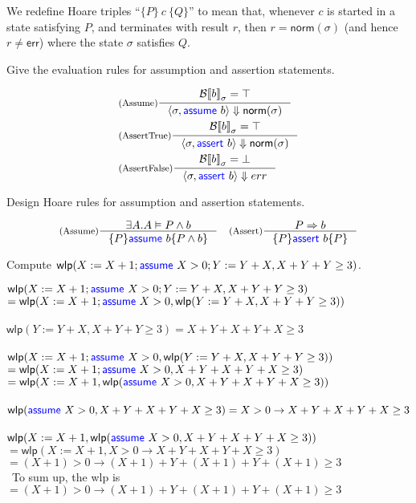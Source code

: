 \documentclass[11pt,a4paper]{article}
\newcommand{\pair}[1]{\langle #1 \rangle}
\newcommand{\evalB}[2]{{\mathcal{B}\llbracket #1 \rrbracket}_{#2}}
\newcommand{\evalC}[3]{\pair{#1, #2} \Downarrow #3}
\newcommand{\norm}[1]{\textsf{norm}(#1)}
\newcommand{\err}{\textsf{err}}
\newcommand{\kword}[1]{{\color{blue} \textsf{#1}}}
\newcommand{\Assume}{\kword{assume}}
\newcommand{\Assert}{\kword{assert}}
\newcommand{\wlp}[2]{\textsf{wlp}(#1, #2)}
\begin{document}
We redefine Hoare triples ``$\{P\}~c~\{Q\}$'' to mean that, whenever $c$ is started in a state satisfying $P$, and terminates with result $r$, then $r=\norm{\sigma}$ (and hence $r\not=\err$) where the state $\sigma$ satisfies $Q$.

\subproblem Give the evaluation rules for assumption and assertion statements.

\begin{solution}
    \begin{align*}
        &\inference[(Assume)]{\evalB{b}{\sigma}=\top}{\evalC{\sigma}{\Assume~b}{\norm{\sigma}}} \\	
        &\inference[(AssertTrue)]{\evalB{b}{\sigma}=\top}{\evalC{\sigma}{\Assert~b}{\norm{\sigma}}} \\
        &\inference[(AssertFalse)]{\evalB{b}{\sigma}=\bot}{\evalC{\sigma}{\Assert~b}{err}} \\	
    \end{align*}
\end{solution}

\subproblem Design Hoare rules for assumption and assertion statements.

\begin{solution}
   \begin{align*}
	&\inference[(Assume)]{\exists A. A \vDash P \land b}
	{\{P\}\Assume~b\{P\land b\}}
	&\inference[(Assert)]{P \Rightarrow b}
		{\{P\}\Assert~b\{P\}}
   \end{align*}
\end{solution}

\subproblem Compute $\wlp{X := X + 1; \Assume~X > 0; Y := Y + X}{X + Y + Y \ge 3}$.

\begin{solution}
    $\wlp{X := X + 1; \Assume~X > 0; Y := Y + X}{X + Y + Y \ge 3}$\\
     $=\wlp{X := X + 1; \Assume~X > 0}{\wlp{Y := Y + X}{X + Y + Y \ge 3}}$\\
     \\
    $\wlp{Y := Y + X}{X + Y + Y \ge 3} = {X + Y + X + Y + X\ge 3} $\\
    \\
    $\wlp{X := X + 1; \Assume~X > 0}{\wlp{Y := Y + X}{X + Y + Y \ge 3}}$\\
    $=\wlp{X := X + 1; \Assume~X > 0}{X + Y + X + Y + X\ge 3}$\\
     $=\wlp{X := X + 1} {\wlp{\Assume~X > 0}{X + Y + X + Y + X\ge 3}}$\\
     \\
     $\wlp{\Assume~X > 0}{X + Y + X + Y + X\ge 3} = X > 0 \to X + Y + X + Y + X\ge 3$\\
     \\
     $\wlp{X := X + 1} {\wlp{\Assume~X > 0}{X + Y + X + Y + X\ge 3}}$\\
     $=\wlp{X := X + 1}{ X > 0 \to X + Y + X + Y + X\ge 3}$\\
     $=(X+1) > 0 \to (X+1) + Y + (X+1) + Y + (X+1) \ge 3$\\\
     To sum up, the wlp is  $=(X+1) > 0 \to (X+1) + Y + (X+1) + Y + (X+1) \ge 3$
     
\end{solution}

\end{document}
